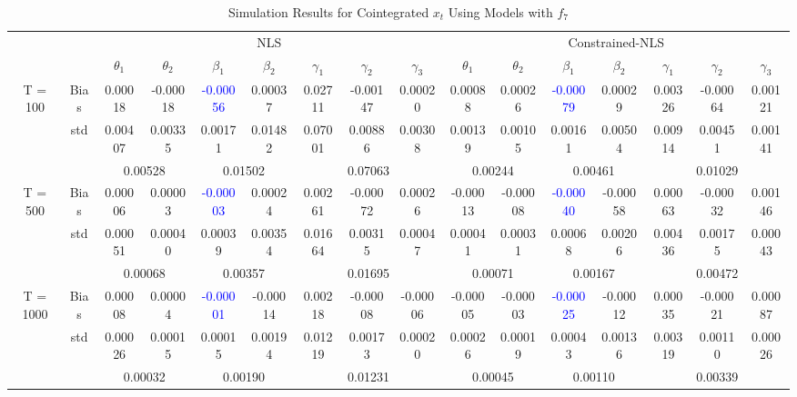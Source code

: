 \documentclass[a4paper,12pt,times,numbered,print,index]{report}
\numberwithin{equation}{section}
\begin{document}
\begin{table}[htbp]
  \centering
  \caption{Simulation Results for Cointegrated $x_t$ Using Models with $f_7$}
    \begin{adjustbox}{max width=\textwidth}
    \begin{tabular}{cccccccccccccccc}
    \toprule
          &       & \multicolumn{7}{c}{NLS}                               & \multicolumn{7}{c}{Constrained-NLS} \\
          &       & $\theta_1$ & $\theta_2$ & $\beta_1$ & $\beta_2$ & $\gamma_1$ & $\gamma_2$ & $\gamma_3$ & $\theta_1$ & $\theta_2$ & $\beta_1$ & $\beta_2$ & $\gamma_1$ & $\gamma_2$ & $\gamma_3$ \\
    \midrule
    \multirow{3}[1]{*}{T = 100} & Bias  & 0.00018 & -0.00018 & \textcolor{blue}{-0.00056} & 0.00037 & 0.02711 & -0.00147 & 0.00020 & 0.00088 & 0.00026 & \textcolor{blue}{-0.00079} & 0.00029 & 0.00326 & -0.00064 & 0.00121 \\
          & std   & 0.00407 & 0.00335 & 0.00171 & 0.01482 & 0.07001 & 0.00886 & 0.00308 & 0.00139 & 0.00105 & 0.00161 & 0.00504 & 0.00914 & 0.00451 & 0.00141 \\
          &       & \multicolumn{2}{c}{0.00528} & \multicolumn{2}{c}{0.01502} & \multicolumn{3}{c}{0.07063} & \multicolumn{2}{c}{0.00244} & \multicolumn{2}{c}{0.00461} & \multicolumn{3}{c}{0.01029} \\
    \multirow{3}[0]{*}{T = 500} & Bias  & 0.00006 & 0.00003 & \textcolor{blue}{-0.00003} & 0.00024 & 0.00261 & -0.00072 & 0.00026 & -0.00013 & -0.00008 & \textcolor{blue}{-0.00040} & -0.00058 & 0.00063 & -0.00032 & 0.00146 \\
          & std   & 0.00051 & 0.00040 & 0.00039 & 0.00354 & 0.01664 & 0.00315 & 0.00047 & 0.00041 & 0.00031 & 0.00068 & 0.00206 & 0.00436 & 0.00175 & 0.00043 \\
          &       & \multicolumn{2}{c}{0.00068} & \multicolumn{2}{c}{0.00357} & \multicolumn{3}{c}{0.01695} & \multicolumn{2}{c}{0.00071} & \multicolumn{2}{c}{0.00167} & \multicolumn{3}{c}{0.00472} \\
    \multirow{3}[1]{*}{T = 1000} & Bias  & 0.00008 & 0.00004 & \textcolor{blue}{-0.00001} & -0.00014 & 0.00218 & -0.00008 & -0.00006 & -0.00005 & -0.00003 & \textcolor{blue}{-0.00025} & -0.00012 & 0.00035 & -0.00021 & 0.00087 \\
          & std   & 0.00026 & 0.00015 & 0.00015 & 0.00194 & 0.01219 & 0.00173 & 0.00020 & 0.00026 & 0.00019 & 0.00043 & 0.00136 & 0.00319 & 0.00110 & 0.00026 \\
          &       & \multicolumn{2}{c}{0.00032} & \multicolumn{2}{c}{\textcolor[rgb]{ .329,  .51,  .208}{0.00190}} & \multicolumn{3}{c}{\textcolor[rgb]{ .329,  .51,  .208}{0.01231}} & \multicolumn{2}{c}{0.00045} & \multicolumn{2}{c}{\textcolor[rgb]{ .329,  .51,  .208}{0.00110}} & \multicolumn{3}{c}{\textcolor[rgb]{ .329,  .51,  .208}{0.00339}} \\
    \bottomrule
    \bottomrule
    \end{tabular}%
    \end{adjustbox}
  \label{s_f7}%
\end{table}%
\end{document}
